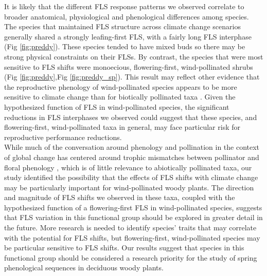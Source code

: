 \documentclass[11pt]{article}\usepackage[]{graphicx}\usepackage[]{color}
\begin{document}
\noindent It is likely that the different FLS response patterns we observed correlate to broader anatomical, physiological and phenological differences among species. The species that maintained FLS structure across climate change scenarios generally shared a strongly leafing-first FLS, with a fairly long FLS interphase (Fig \ref{fig:preddy}). These species tended to have mixed buds so there may be strong physical constraints on their FLSs. By contrast, the species that were most sensitive to FLS shifts were monoecious, flowering-first, wind-pollinated shrubs (Fig \ref{fig:preddy},Fig \ref{fig:preddy_sp}). This result may reflect other evidence that the reproductive phenology of wind-pollinated species appears to be more sensitive to climate change than for biotically pollinated taxa \citep{Ziello:2012aa}. Given the hypothesized function of FLS in wind-pollinated species, the significant reductions in FLS interphases we observed could suggest that these species, and flowering-first, wind-pollinated taxa in general, may face particular risk for reproductive performance reductions.\\

\noindent While much of the conversation around phenology and pollination in the context of global change has centered around trophic mismatches between pollinator and floral phenology \citep{Memmott2007}, which is of little relevance to abiotically pollinated taxa, our study identified the possibility that the effects of FLS shifts with climate change may be particularly important for wind-pollinated woody plants. The direction and magnitude of FLS shifts we observed in these taxa, coupled with the hypothesized function of a flowering-first FLS in wind-pollinated species, suggests that FLS variation in this functional group should be explored in greater detail in the future. More research is needed to identify species' traits that may correlate with the potential for FLS shifts, but flowering-first, wind-pollinated species may be particular sensitive to FLS shifts. Our results suggest that species in this functional group should be considered a research priority for the study of spring phenological sequences in deciduous woody plants.\\ 


 
\end{document}
